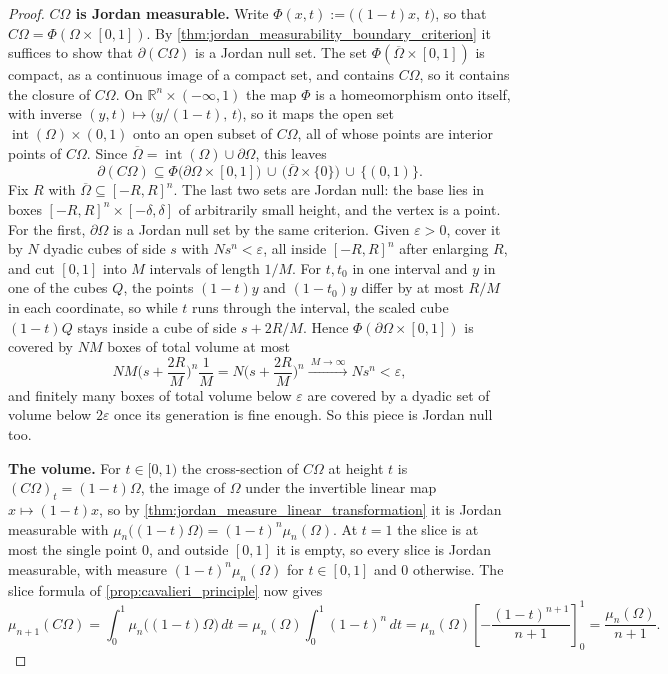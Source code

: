 \begin{proof}
\textbf{$C\Omega$ is Jordan measurable.} Write $\Phi(x,t) := \big((1-t)x,\,t\big)$, so that
$C\Omega = \Phi(\Omega\times[0,1])$. By \cref{thm:jordan_measurability_boundary_criterion} it
suffices to show that $\partial(C\Omega)$ is a Jordan null set. The set
$\Phi(\overline\Omega\times[0,1])$ is compact, as a continuous image of a compact set, and
contains $C\Omega$, so it contains the closure of $C\Omega$. On $\mathbb{R}^n\times(-\infty,1)$
the map $\Phi$ is a homeomorphism onto itself, with inverse $(y,t) \mapsto \big(y/(1-t),\,t\big)$,
so it maps the open set $\operatorname{int}(\Omega)\times(0,1)$ onto an open subset of $C\Omega$,
all of whose points are interior points of $C\Omega$. Since
$\overline\Omega = \operatorname{int}(\Omega) \cup \partial\Omega$, this leaves
\[\partial(C\Omega) \subseteq \Phi\big(\partial\Omega\times[0,1]\big) \,\cup\,
  \big(\overline\Omega\times\{0\}\big) \,\cup\, \{(0,1)\}.\]
Fix $R$ with $\overline\Omega \subseteq [-R,R]^n$. The last two sets are Jordan null: the base
lies in boxes $[-R,R]^n \times [-\delta,\delta]$ of arbitrarily small height, and the vertex is
a point. For the first, $\partial\Omega$ is a Jordan null set by the same criterion. Given
$\varepsilon > 0$, cover it by $N$ dyadic cubes of side $s$ with $Ns^n < \varepsilon$, all inside
$[-R,R]^n$ after enlarging $R$, and cut $[0,1]$ into $M$ intervals of length $1/M$. For $t, t_0$
in one interval and $y$ in one of the cubes $Q$, the points $(1-t)y$ and $(1-t_0)y$ differ by at
most $R/M$ in each coordinate, so while $t$ runs through the interval, the scaled cube $(1-t)Q$
stays inside a cube of side $s + 2R/M$. Hence $\Phi(\partial\Omega\times[0,1])$ is covered by
$NM$ boxes of total volume at most
\[NM\Big(s+\frac{2R}{M}\Big)^n\frac1M = N\Big(s+\frac{2R}{M}\Big)^n
  \xrightarrow{\ M\to\infty\ } Ns^n < \varepsilon,\]
and finitely many boxes of total volume below $\varepsilon$ are covered by a dyadic set of
volume below $2\varepsilon$ once its generation is fine enough. So this piece is Jordan null too.

\textbf{The volume.} For $t \in [0,1)$ the cross-section of $C\Omega$ at height $t$ is
$(C\Omega)_t = (1-t)\Omega$, the image of $\Omega$ under the invertible linear map
$x \mapsto (1-t)x$, so by \cref{thm:jordan_measure_linear_transformation} it is Jordan measurable
with $\mu_n\big((1-t)\Omega\big) = (1-t)^n \mu_n(\Omega)$. At $t = 1$ the slice is at most the
single point $0$, and outside $[0,1]$ it is empty, so every slice is Jordan measurable, with
measure $(1-t)^n\mu_n(\Omega)$ for $t \in [0,1]$ and $0$ otherwise. The slice formula of
\cref{prop:cavalieri_principle} now gives
\[
\mu_{n+1}(C\Omega) = \int_0^1 \mu_n\big((1-t)\Omega\big) \,dt = \mu_n(\Omega) \int_0^1 (1-t)^n \,dt = \mu_n(\Omega) \left[ -\frac{(1-t)^{n+1}}{n+1} \right]_0^1 = \frac{\mu_n(\Omega)}{n+1}.
\]
\end{proof}

